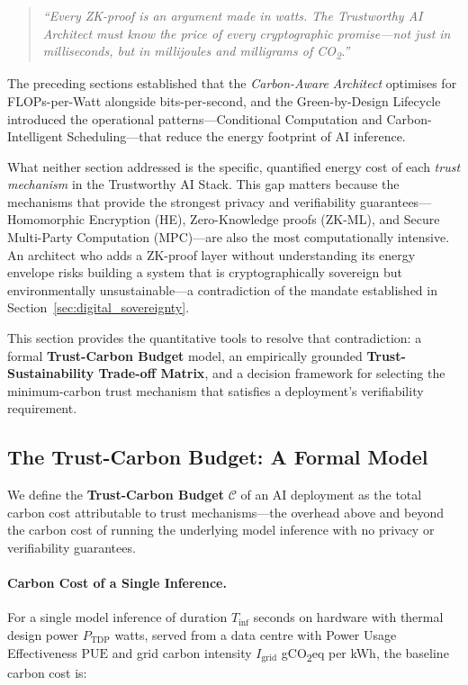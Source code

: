 \begin{quote}
\textit{``Every ZK-proof is an argument made in watts.
  The Trustworthy AI Architect must know the price of every
  cryptographic promise---not just in milliseconds, but in
  millijoules and milligrams of CO\textsubscript{2}.''}
\end{quote}

The preceding sections established that the
\emph{Carbon-Aware Architect} optimises for FLOPs-per-Watt
alongside bits-per-second, and the Green-by-Design Lifecycle
introduced the operational patterns---Conditional Computation and
Carbon-Intelligent Scheduling---that reduce the energy footprint
of AI inference.

What neither section addressed is the specific, quantified energy
cost of each \emph{trust mechanism} in the Trustworthy AI Stack.
This gap matters because the mechanisms that provide the strongest
privacy and verifiability guarantees---Homomorphic Encryption (HE),
Zero-Knowledge proofs (ZK-ML), and Secure Multi-Party Computation
(MPC)---are also the most computationally intensive.
An architect who adds a ZK-proof layer without understanding its
energy envelope risks building a system that is cryptographically
sovereign but environmentally unsustainable---a contradiction of
the mandate established in Section~\ref{sec:digital_sovereignty}.

This section provides the quantitative tools to resolve that
contradiction: a formal \textbf{Trust-Carbon Budget} model, an
empirically grounded \textbf{Trust-Sustainability Trade-off Matrix},
and a decision framework for selecting the minimum-carbon trust
mechanism that satisfies a deployment's verifiability requirement.

\subsection{The Trust-Carbon Budget: A Formal Model}
\label{subsec:trust-carbon-budget}

We define the \textbf{Trust-Carbon Budget} $\mathcal{C}$ of an AI
deployment as the total carbon cost attributable to trust
mechanisms---the overhead above and beyond the carbon cost of
running the underlying model inference with no privacy or
verifiability guarantees.

\paragraph{Carbon Cost of a Single Inference.}
For a single model inference of duration $T_{\mathrm{inf}}$
seconds on hardware with thermal design power $P_{\mathrm{TDP}}$
watts, served from a data centre with Power Usage Effectiveness
$\mathrm{PUE}$ and grid carbon intensity $I_{\mathrm{grid}}$
gCO\textsubscript{2}eq per kWh, the baseline carbon cost is:

